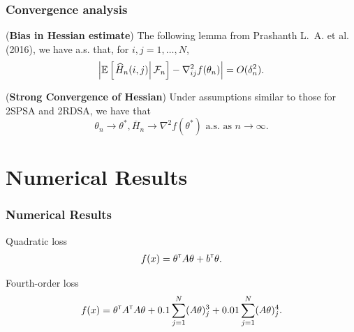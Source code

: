 \begin{frame}
\begin{small}
\frametitle{\centering Convergence analysis}

\begin{lemma}(\textbf{Bias in Hessian estimate})
\label{lemma:2rdsa-bias}
The following lemma from Prashanth L.~A. et al. (2016)\footnotemark[1], we have a.s. that\footnotemark[2], for $i,j = 1,\ldots,N$,
\begin{align}
\left|\mathbb{E}\left[
\left. \widehat H_n(i,j) \right| \mathcal{F}_n \right] - \nabla^2_{ij} f(\theta_n)\right| = O(\delta_n^2).
\end{align} 
\end{lemma}
\begin{theorem}(\textbf{Strong Convergence of Hessian})
\label{thm:2rdsa-H}
Under assumptions similar to those for 2SPSA and 2RDSA, we have that 
$$\theta_n \rightarrow \theta^*, \overline H_n \rightarrow \nabla^2 f(\theta^*) \text{ a.s. as } n\rightarrow \infty.$$ 
\end{theorem}
\end{small}
\end{frame}



\section{Numerical Results}
\begin{frame}
\begin{small}
\frametitle{\centering Numerical Results}
\begin{block}{Quadratic loss}
\begin{align}
f(x) = \theta^\mathsf{\scriptscriptstyle T} A \theta + b^\mathsf{\scriptscriptstyle T} \theta.\label{eq:quadratic}
\end{align}
\end{block}
\begin{block}{Fourth-order loss}
\begin{align} 
f(x) = \theta^\mathsf{\scriptscriptstyle T} A^\mathsf{\scriptscriptstyle T} A \theta + 0.1 \sum_{j=1}^N (A\theta)^3_j + 0.01 \sum_{j=1}^N (A\theta)^4_j.\label{eq:4thorder}
 \end{align} 
 \end{block}
 \end{small}
\end{frame}

